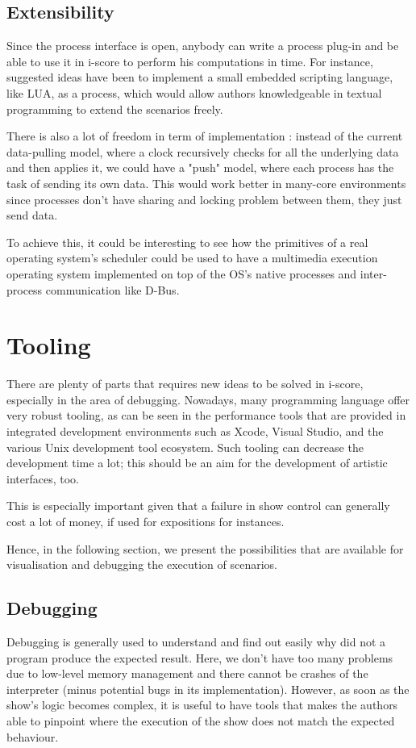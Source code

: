 \documentclass{sigchi}
\begin{document}
\subsection{Extensibility}
Since the process interface is open, anybody can write a process plug-in and be able to use it in i-score to perform his computations in time. For instance, suggested ideas have been to implement a small embedded scripting language, like LUA, as a process, which would allow authors knowledgeable in textual programming to extend the scenarios freely.

There is also a lot of freedom in term of implementation : instead of the current data-pulling model, where a clock recursively checks for all the underlying data and then applies it, we could have a "push" model, where each process has the task of sending its own data. This would work better in many-core environments since processes don't have sharing and locking problem between them, they just send data.

To achieve this, it could be interesting to see how the primitives of a real operating system's scheduler could be used to have a multimedia execution operating system implemented on top of the OS's native processes and inter-process communication like D-Bus.

\section{Tooling}
There are plenty of parts that requires new ideas to be solved in i-score, especially in the area of debugging. Nowadays, many programming language offer very robust tooling, as can be seen in the performance tools that are provided in integrated development environments such as Xcode, Visual Studio, and the various Unix development tool ecosystem\cite{spinellis2014software}. Such tooling can decrease the development time a lot; this should be an aim for the development of artistic interfaces, too.

This is especially important given that a failure in show control can generally cost a lot of money, if used for expositions for instances.

Hence, in the following section, we present the possibilities that are available for visualisation and debugging the execution of scenarios.

\subsection{Debugging}
Debugging is generally used to understand and find out easily why did not a program produce the expected result. Here, we don't have too many problems due to low-level memory management and there cannot be crashes of the interpreter (minus potential bugs in its implementation).  However, as soon as the show's logic becomes complex, it is useful to have tools that makes the authors able to pinpoint where the execution of the show does not match the expected behaviour.
\end{document}
